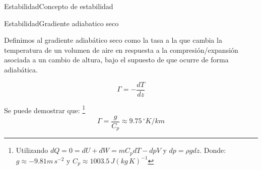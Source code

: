 \begin{frame}{Estabilidad}{Concepto de estabilidad}
\begin{center}
    \end{center}
\end{frame}

\begin{frame}{Estabilidad}{Gradiente adiabatico seco}
 
 
Definimos al \alert{gradiente adiabático seco} como la tasa a la que cambia la temperatura de un volumen de aire en respuesta a la compresión/expansión asociada a un cambio de altura, bajo el supuesto de que ocurre de forma adiabática. 
 
$$\Gamma= -\dfrac{dT}{dz} $$
 
 Se puede demostrar que:  \footnote{Utilizando $d Q = 0 = dU + dW = mC_pdT - dp V$ y $dp = \rho g dz$. Donde: $g\approx-9.81 m\,s^{-2}$ y $C_p\approx 1003.5\, J(kg\,K)^{-1}$} 
$$\Gamma=  \dfrac{g}{C_p}\approx  9.75 \, ^\circ K/km $$
    
    
\end{frame}


